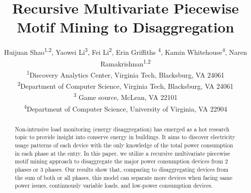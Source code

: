 \documentclass[sigconf]{acmart}
\begin{document}
\title{Recursive Multivariate Piecewise Motif Mining to Disaggregation}

\author{
  Huijuan Shao\textsuperscript{1,2}, Yaowei Li\textsuperscript{3}, Fei Li\textsuperscript{2}, Erin Griffiths \textsuperscript{4}, Kamin Whitehouse\textsuperscript{4}, Naren Ramakrishnan\textsuperscript{1,2} \\
  \textsuperscript{1}Discovery Analytics Center, Virginia Tech, Blacksburg, VA 24061 \\ %
  \textsuperscript{2}Department of Computer Science, Virginia Tech, Blacksburg, VA 24061 \\ %
    \textsuperscript{3} Game source, McLean, VA 22101 \\
  \textsuperscript{4}Department of Computer Science, University of Virginia, VA 22904 \\ %
}




\renewcommand{\shortauthors}{H. Shao et al.}


\begin{abstract}
Non-intrusive load monitoring (energy disaggregation) has emerged as a hot research topic 
to provide insight into conserve energy in buildings. 
It aims to discover electricity usage patterns of each device 
with the only knowledge of the total power consumption in each phase at the entry. 
In this paper, we utilize a recursive multivariate piecewise motif mining approach
to disaggregate the major power consumption devices from 2 phases or 3 phases. 
Our results show that, comparing to disaggregating devices from the sum of 
both or all phases, 
this model can separate more devices 
when facing same power issues, continuously variable loads, 
and low-power consumption devices. 
\end{abstract}

%
%




\maketitle



%






%
 


 
\end{document}
